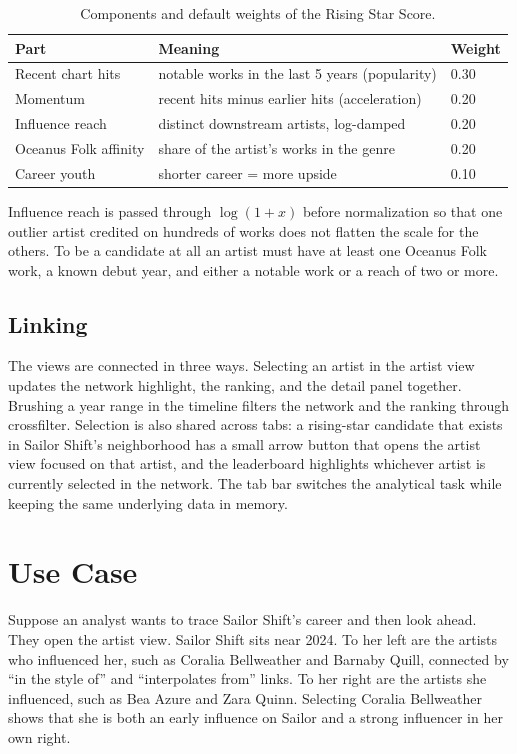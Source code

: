 \documentclass[11pt]{article}
\begin{document}
\begin{table}[ht]\centering
\caption{Components and default weights of the Rising Star Score.}\label{tab:weights}
\begin{tabular}{lll}
\toprule
Part & Meaning & Weight \\
\midrule
Recent chart hits & notable works in the last 5 years (popularity) & 0.30 \\
Momentum & recent hits minus earlier hits (acceleration) & 0.20 \\
Influence reach & distinct downstream artists, log-damped & 0.20 \\
Oceanus Folk affinity & share of the artist's works in the genre & 0.20 \\
Career youth & shorter career = more upside & 0.10 \\
\bottomrule
\end{tabular}
\end{table}

Influence reach is passed through $\log(1+x)$ before normalization so that one outlier
artist credited on hundreds of works does not flatten the scale for the others. To be a
candidate at all an artist must have at least one Oceanus Folk work, a known debut year,
and either a notable work or a reach of two or more.

\subsection{Linking}
The views are connected in three ways. Selecting an artist in the artist view updates the
network highlight, the ranking, and the detail panel together. Brushing a year range in the
timeline filters the network and the ranking through crossfilter. Selection is also shared
across tabs: a rising-star candidate that exists in Sailor Shift's neighborhood has a small
arrow button that opens the artist view focused on that artist, and the leaderboard
highlights whichever artist is currently selected in the network. The tab bar switches the
analytical task while keeping the same underlying data in memory.

\section{Use Case}
Suppose an analyst wants to trace Sailor Shift's career and then look ahead. They open the
artist view. Sailor Shift sits near 2024. To her left are the artists who influenced her,
such as Coralia Bellweather and Barnaby Quill, connected by ``in the style of'' and
``interpolates from'' links. To her right are the artists she influenced, such as Bea Azure
and Zara Quinn. Selecting Coralia Bellweather shows that she is both an early influence on
Sailor and a strong influencer in her own right.
\end{document}
